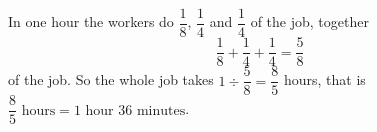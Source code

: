 In one hour the workers do $\dfrac{1}{8}$, $\dfrac{1}{4}$ and $\dfrac{1}{4}$ of the job, together
\[
\dfrac{1}{8}+\dfrac{1}{4}+\dfrac{1}{4}=\dfrac{5}{8}
\]
of the job. So the whole job takes $1\div\dfrac{5}{8}=\dfrac{8}{5}$ hours, that is $\boxed{\dfrac{8}{5}\text{ hours}=1\text{ hour }36\text{ minutes}}$.
